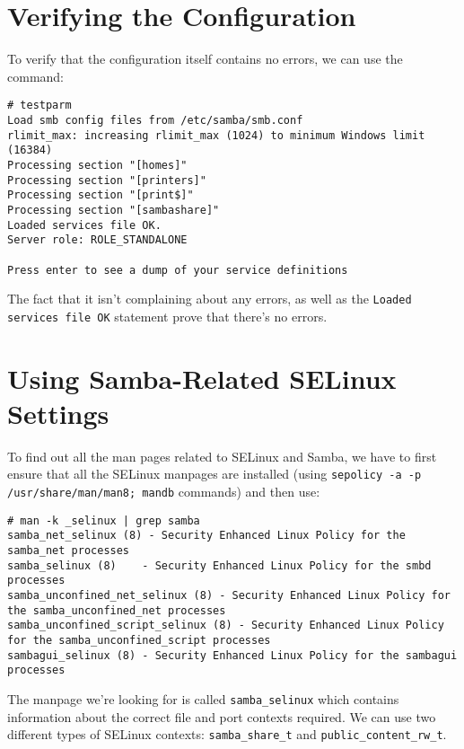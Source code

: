 \section{Verifying the Configuration}
To verify that the configuration itself contains no errors, we can use the command:

\vspace{-15pt}
\begin{verbatim}
# testparm
Load smb config files from /etc/samba/smb.conf
rlimit_max: increasing rlimit_max (1024) to minimum Windows limit (16384)
Processing section "[homes]"
Processing section "[printers]"
Processing section "[print$]"
Processing section "[sambashare]"
Loaded services file OK.
Server role: ROLE_STANDALONE

Press enter to see a dump of your service definitions
\end{verbatim}
\vspace{-10pt}	

\noindent
The fact that it isn't complaining about any errors, as well as the \verb|Loaded services file OK| statement prove that there's no errors. 

\section{Using Samba-Related SELinux Settings}
To find out all the man pages related to SELinux and Samba, we have to first ensure that all the SELinux manpages are installed (using \verb|sepolicy -a -p /usr/share/man/man8; mandb| commands) and then use:

\vspace{-15pt}
\begin{verbatim}
# man -k _selinux | grep samba
samba_net_selinux (8) - Security Enhanced Linux Policy for the samba_net processes
samba_selinux (8)    - Security Enhanced Linux Policy for the smbd processes
samba_unconfined_net_selinux (8) - Security Enhanced Linux Policy for the samba_unconfined_net processes
samba_unconfined_script_selinux (8) - Security Enhanced Linux Policy for the samba_unconfined_script processes
sambagui_selinux (8) - Security Enhanced Linux Policy for the sambagui processes
\end{verbatim}
\vspace{-10pt}	

\noindent
The manpage we're looking for is called \verb|samba_selinux| which contains information about the correct file and port contexts required. We can use two different types of SELinux contexts: \verb|samba_share_t| and \verb|public_content_rw_t|. 

